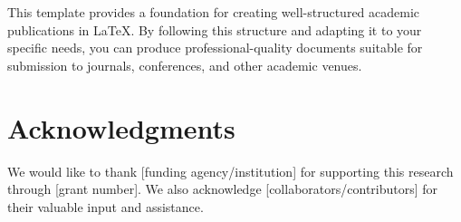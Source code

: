 \documentclass[12pt,a4paper]{article}
\begin{document}
This template provides a foundation for creating well-structured academic publications in \LaTeX{}. By following this structure and adapting it to your specific needs, you can produce professional-quality documents suitable for submission to journals, conferences, and other academic venues.

\section*{Acknowledgments}
We would like to thank [funding agency/institution] for supporting this research through [grant number]. We also acknowledge [collaborators/contributors] for their valuable input and assistance.

\end{document}

